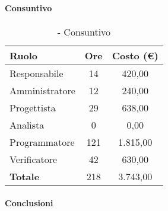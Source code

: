 \documentclass[./PianoDiProgetto.tex]{subfiles}
\begin{document}
\paragraph{Consuntivo}	
\begin{table}[H]
		\centering

		\begin{tabular}{l * {2}{c}}
			\toprule
			\textbf{Ruolo} & \textbf{Ore} & \textbf{Costo (\euro{})} \\
			\midrule
			Responsabile & 14    &  420,00 \\
			Amministratore  & 12    &  240,00 \\
			Progettista  & 29   &  638,00 \\
			Analista & 0    &  0,00 \\
			Programmatore  & 121    &  1.815,00 \\
			Verificatore  & 42    &  630,00 \\
			\midrule
			\textbf{Totale}  & 218   &  3.743,00 \\
			\bottomrule
		\end{tabular}
		\caption{\PerC{} - Consuntivo}
	\end{table}
	\paragraph{Conclusioni}
\clearpage
\end{document}
